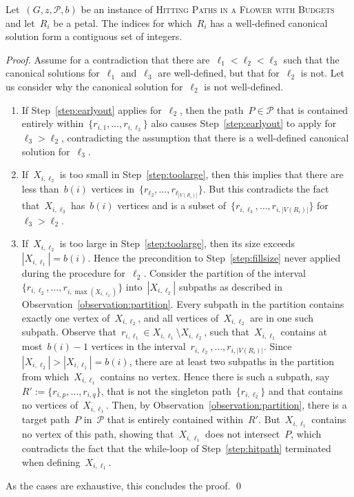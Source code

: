 \let\accentvec\vec  \documentclass{llncs}
\renewcommand{\P}{\ensuremath{\mathcal{P}}\xspace}
\newcommand{\HitPathsInFlower}{\textsc{Hitting Paths in a Flower with Budgets}\xspace}
\begin{document}
\begin{lemma} \label{lemma:contiguous}
Let~$(G,z,\P,b)$ be an instance of \HitPathsInFlower and let~$R_i$ be a petal. The indices for which~$R_i$ has a well-defined canonical solution form a contiguous set of integers.
\end{lemma}
\begin{proof}
Assume for a contradiction that there are~$\ell_1 < \ell_2 < \ell_3$ such that the canonical solutions for~$\ell_1$ and~$\ell_3$ are well-defined, but that for~$\ell_2$ is not. Let us consider why the canonical solution for~$\ell_2$ is not well-defined. 
\begin{enumerate}
	\item If Step~\ref{step:earlyout} applies for~$\ell_2$, then the path~$P \in \P$ that is contained entirely within~$\{r_{i,1}, \ldots, r_{i,\ell_2}\}$ also causes Step~\ref{step:earlyout} to apply for~$\ell_3 > \ell_2$, contradicting the assumption that there is a well-defined canonical solution for~$\ell_3$.
	\item If~$X_{i,\ell_2}$ is too small in Step~\ref{step:toolarge}, then this implies that there are less than~$b(i)$ vertices in~$\{r_{\ell_2}, \ldots, r_{\ell_{|V(R_i)|}}\}$. But this contradicts the fact that~$X_{i,\ell_3}$ has~$b(i)$ vertices and is a subset of~$\{r_{i,\ell_3}, \ldots, r_{i,|V(R_i)|}\}$ for~$\ell_3 > \ell_2$.
	\item If~$X_{i,\ell_2}$ is too large in Step~\ref{step:toolarge}, then its size exceeds~$|X_{i,\ell_1}| = b(i)$. Hence the precondition to Step~\ref{step:fillsize} never applied during the procedure for~$\ell_2$. Consider the partition of the interval~$\{r_{i,\ell_2}, \ldots, r_{i,\max (X_{i,\ell_2})}\}$ into~$|X_{i,\ell_2}|$ subpaths as described in Observation~\ref{observation:partition}. Every subpath in the partition contains exactly one vertex of~$X_{i,\ell_2}$, and all vertices of~$X_{i,\ell_2}$ are in one such subpath. Observe that~$r_{i,\ell_1} \in X_{i,\ell_1} \setminus X_{i,\ell_2}$, such that~$X_{i,\ell_1}$ contains at most~$b(i) - 1$ vertices in the interval~$r_{i,\ell_2}, \ldots, r_{i,|V(R_i)|}$. Since~$|X_{i,\ell_2}| > |X_{i,\ell_1}| = b(i)$, there are at least two subpaths in the partition from which~$X_{i,\ell_1}$ contains no vertex. Hence there is such a subpath, say~$R' := \{r_{i,p}, \ldots, r_{i,q}\}$, that is not the singleton path~$\{r_{i,\ell_2}\}$ and that contains no vertices of~$X_{i,\ell_1}$. Then, by Observation~\ref{observation:partition}, there is a target path~$P$ in~$\P$ that is entirely contained within~$R'$. But~$X_{i,\ell_1}$ contains no vertex of this path, showing that~$X_{i,\ell_1}$ does not intersect~$P$, which contradicts the fact that the while-loop of Step~\ref{step:hitpath} terminated when defining~$X_{i,\ell_1}$.
\end{enumerate}
As the cases are exhaustive, this concludes the proof.
\qed
\end{proof}
\end{document}
